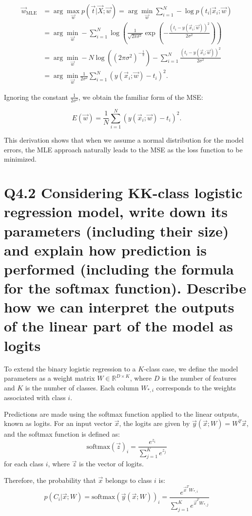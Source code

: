 \documentclass[11pt]{article}
\begin{document}
\[
\begin{aligned}
\vec{w}_{\text{MLE}} &= \arg \max_{\vec{w}} p(\vec{t}|\vec{X}; \vec{w}) = \arg \min_{\vec{w}} \sum_{i=1}^{N} -\log p(t_i|\vec{x}_i; \vec{w}) \\
&= \arg \min_{\vec{w}} -\sum_{i=1}^{N} \log \left(\frac{1}{\sqrt{2\pi\sigma^2}} \exp\left(-\frac{(t_i - y(\vec{x}_i; \vec{w}))^2}{2\sigma^2}\right)\right) \\
&= \arg \min_{\vec{w}} -N \log \left((2\pi\sigma^2)^{-\frac{1}{2}}\right) - \sum_{i=1}^{N} \frac{(t_i - y(\vec{x}_i; \vec{w}))^2}{2\sigma^2} \\
&= \arg \min_{\vec{w}} \frac{1}{2\sigma^2} \sum_{i=1}^{N} (y(\vec{x}_i; \vec{w}) - t_i)^2.
\end{aligned}
\]

Ignoring the constant \( \frac{1}{2\sigma^2} \), we obtain the familiar form of the MSE:

\[
E(\vec{w}) = \frac{1}{N} \sum_{i=1}^{N} (y(\vec{x}_i; \vec{w}) - t_i)^2.
\]

This derivation shows that when we assume a normal distribution for the model errors, the MLE approach naturally leads to the MSE as the loss function to be minimized.


\section{Q4.2 Considering KK-class logistic regression model, write down its parameters (including their size) and explain how prediction is performed (including the formula for the softmax function). Describe how we can interpret the outputs of the linear part of the model as logits}

To extend the binary logistic regression to a \( K \)-class case, we define the model parameters as a weight matrix \( W \in \mathbb{R}^{D \times K} \), where \( D \) is the number of features and \( K \) is the number of classes. Each column \( W_{*,i} \) corresponds to the weights associated with class \( i \).

Predictions are made using the softmax function applied to the linear outputs, known as logits. For an input vector \( \vec{x} \), the logits are given by \( \vec{y}(\vec{x}; W) = W^T\vec{x} \), and the softmax function is defined as:
\[
\text{softmax}(\vec{z})_i = \frac{e^{z_i}}{\sum_{j=1}^{K} e^{z_j}}
\]
for each class \( i \), where \( \vec{z} \) is the vector of logits. 

Therefore, the probability that \( \vec{x} \) belongs to class \( i \) is:
\[
p(C_i | \vec{x}; W) = \text{softmax}(\vec{y}(\vec{x}; W))_i = \frac{e^{\vec{x}^TW_{*,i}}}{\sum_{j=1}^{K} e^{\vec{x}^TW_{*,j}}}
\]
\end{document}
